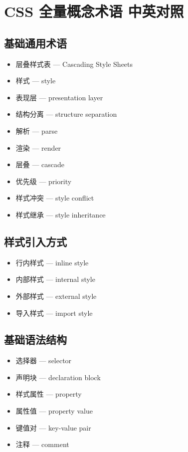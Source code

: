 
\section{CSS 全量概念术语 中英对照}

\subsection{基础通用术语}
\begin{itemize}
\item 层叠样式表 — Cascading Style Sheets
\item 样式 — style
\item 表现层 — presentation layer
\item 结构分离 — structure separation
\item 解析 — parse
\item 渲染 — render
\item 层叠 — cascade
\item 优先级 — priority
\item 样式冲突 — style conflict
\item 样式继承 — style inheritance
\end{itemize}

\subsection{样式引入方式}
\begin{itemize}
\item 行内样式 — inline style
\item 内部样式 — internal style
\item 外部样式 — external style
\item 导入样式 — import style
\end{itemize}

\subsection{基础语法结构}
\begin{itemize}
\item 选择器 — selector
\item 声明块 — declaration block
\item 样式属性 — property
\item 属性值 — property value
\item 键值对 — key-value pair
\item 注释 — comment
\end{itemize}

